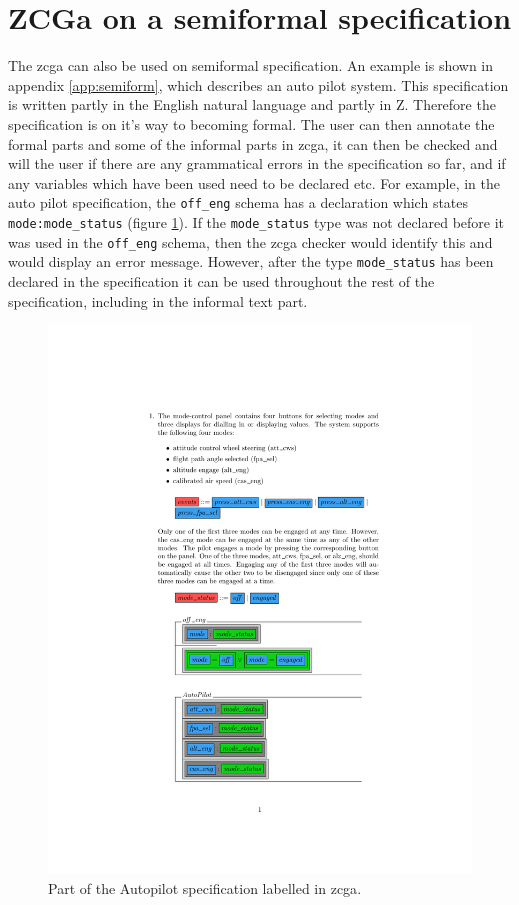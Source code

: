 \section{ZCGa on a semiformal specification}

The \gls{zcga} can also be used on semiformal specification. An example is shown
in appendix \ref{app:semiform}, which describes an auto pilot system. This
specification is written partly in the English natural language and partly in Z.
Therefore the specification is on it's way to becoming formal. The user can then
annotate the formal parts and some of the informal parts in \gls{zcga}, it can
then be checked and will the user if there are any grammatical errors in the
specification so far, and if any variables which have been used need to be
declared etc. For example, in the auto pilot specification, the \verb|off_eng|
schema has a declaration which states \verb|mode:mode_status| (figure
\ref{fig:zcgautopilot}). If the \verb|mode_status| type was not declared before
it was used in the \verb|off_eng| schema, then the \gls{zcga} checker would
identify this and would display an error message. However, after the type
\verb|mode_status| has been declared in the specification it can be used
throughout the rest of the specification, including in the informal text part.

\begin{figure}[H]
\centering
\includegraphics[clip, trim=3.5cm 10cm 1.5cm 2cm, scale=0.6]{examples/semiform/1.pdf}
\caption{Part of the Autopilot specification labelled in \gls{zcga}. \label{fig:zcgautopilot}}
\end{figure}

